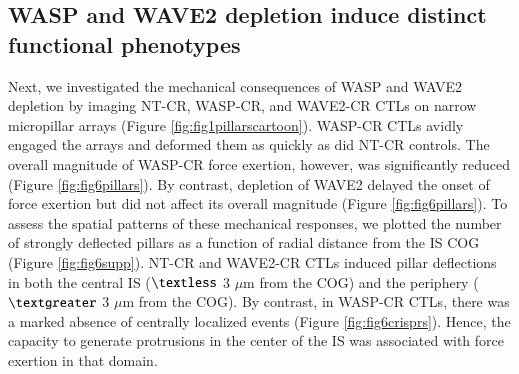 \subsection{WASP and WAVE2 depletion induce distinct functional phenotypes}
Next, we investigated the mechanical consequences of WASP and WAVE2 depletion by imaging NT-CR, WASP-CR, and WAVE2-CR CTLs on narrow micropillar arrays (Figure \ref{fig:fig1pillarscartoon}). WASP-CR CTLs avidly engaged the arrays and deformed them as quickly as did NT-CR controls. The overall magnitude of WASP-CR force exertion, however, was significantly reduced (Figure \ref{fig:fig6pillars}). By contrast, depletion of WAVE2 delayed the onset of force exertion but did not affect its overall magnitude (Figure \ref{fig:fig6pillars}). To assess the spatial patterns of these mechanical responses, we plotted the number of strongly deflected pillars as a function of radial distance from the IS COG (Figure \ref{fig:fig6supp}). NT-CR and WAVE2-CR CTLs induced pillar deflections in both the central IS ($\textless$ 3 $\mu$m from the COG) and the periphery ($\textgreater$ 3 $\mu$m from the COG). By contrast, in WASP-CR CTLs, there was a marked absence of centrally localized events (Figure \ref{fig:fig6crisprs}). Hence, the capacity to generate protrusions in the center of the IS was associated with force exertion in that domain. 

